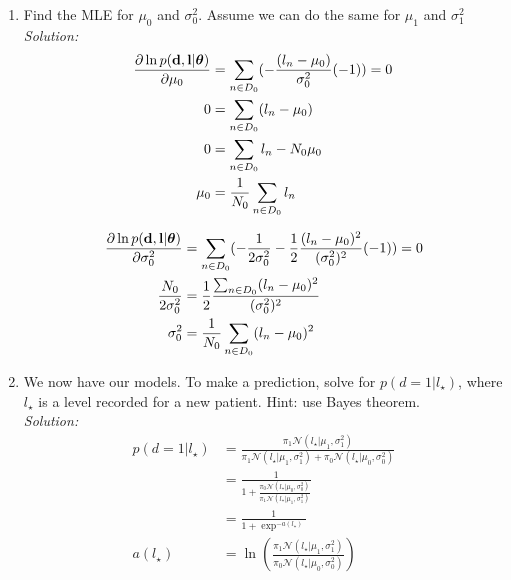 \documentclass[12pt,a4paper]{article}
\newcommand{\thetavec}{\boldsymbol{\theta}}
\newcommand{\dvec}{{\bf d}}
\newcommand{\lvec}{{\bf l}}
\begin{document}
\begin{enumerate}
  \item Find the MLE for $\mu_0$ and $\sigma_0^2$.  Assume we can do the same for $\mu_1$ and $\sigma_1^2$ \\
	  \emph{Solution:} \\
		  \begin{align*}
		  	\frac{\partial \ln p(\dvec, \lvec | \thetavec)}{\partial \mu_{0}} &= \sum_{n \in D_{0}} (- \frac{(l_{n} - \mu_{0})}{\sigma_{0}^{2}} (-1)) = 0 \\
		  	0 &= \sum_{n \in D_{0}} (l_{n} - \mu_{0}) \\
		  	0 &= \sum_{n \in D_{0}} l_{n} - N_{0} \mu_{0} \\
		  	\mu_{0} &= \frac{1}{N_{0}} \sum_{n \in D_{0}} l_{n}
		  \end{align*}
		  
		  \begin{align*}
		  	\frac{\partial \ln p(\dvec, \lvec | \thetavec)}{\partial \sigma_{0}^{2}} &= \sum_{n \in D_{0}} (- \frac{1}{2 \sigma_{0}^{2}} - \frac{1}{2} \frac{(l_{n} - \mu_{0})^{2}}{(\sigma_{0}^{2})^{2}}(-1)) = 0 \\
		  	\frac{N_{0}}{2 \sigma_{0}^{2}} &= \frac{1}{2} \frac{\sum_{n \in D_{0}} (l_{n} - \mu_{0})^{2}}{(\sigma_{0}^{2}) ^{2}} \\
		  	\sigma_{0}^{2} &= \frac{1}{N_{0}} \sum_{n \in D_{0}} (l_{n} - \mu_{0})^{2}
		  \end{align*}
  
  \item We now have our models.  To make a prediction, solve for $p( d=1 | l_{\star})$, where $l_{\star}$ is a level recorded for a new patient.  Hint: use Bayes theorem. \\
	  \emph{Solution:} \\
		  \begin{align*}
		  	p(d = 1 | l_{\star}) &= \frac{\pi_1 \mathcal{N} (l_{\star} | \mu_{1}, \sigma_{1}^{2})}{\pi_1 \mathcal{N} (l_{\star} | \mu_{1}, \sigma_{1}^{2}) + \pi_0 \mathcal{N} (l_{\star} | \mu_{0}, \sigma_{0}^{2})} \\
		  	&= \frac{1}{1 + \frac{\pi_0 \mathcal{N} (l_{\star} | \mu_{0}, \sigma_{0}^{2})}{\pi_1 \mathcal{N} (l_{\star} | \mu_{1}, \sigma_{1}^{2})}} \\
		  	&= \frac{1}{1 + \exp^{-a(l_{\star})}} \\
		  	a(l_{\star}) &= \ln (\frac{\pi_1 \mathcal{N} (l_{\star} | \mu_{1}, \sigma_{1}^{2})}{\pi_0 \mathcal{N} (l_{\star} | \mu_{0}, \sigma_{0}^{2})})
		  \end{align*}
  

\end{enumerate}
\end{document}
